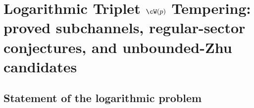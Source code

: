 
\chapter{Logarithmic Triplet $\cW(p)$ Tempering: proved
subchannels, regular-sector conjectures, and unbounded-Zhu candidates}
\label{ch:logarithmic-wp-tempered-analysis}
\label{ch:log-w-algebras}%

\section*{Statement of the logarithmic problem}

